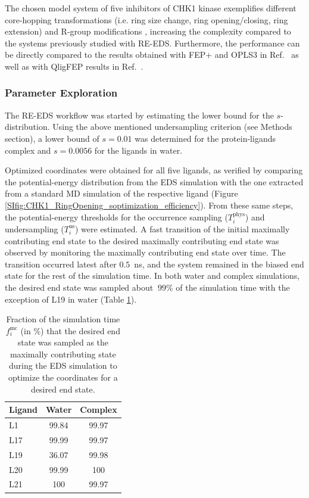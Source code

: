The chosen model system of five inhibitors of CHK1 kinase exemplifies different core-hopping transformations (i.e. ring size change, ring opening/closing, ring extension) and R-group modifications \cite{Wang2017}, increasing the complexity compared to the systems previously studied with RE-EDS. Furthermore, the performance can be directly compared to the results obtained with FEP+ and OPLS3 in Ref.~\cite{Wang2017} as well as with QligFEP results in Ref.~\cite{Jespers2019}.

\subsubsection{Parameter Exploration}
The RE-EDS workflow was started by estimating the lower bound for the $s$-distribution. Using the above mentioned undersampling criterion (see Methods section), a lower bound of $s=0.01$ was determined for the protein-ligands complex and $s=0.0056$ for the ligands in water. 

Optimized coordinates were obtained for all five ligands, as verified by comparing the potential-energy distribution from the EDS simulation with the one extracted from a standard MD simulation of the respective ligand (Figure \ref{SIfig:CHK1_RingOpening_soptimization_efficiency}). 
From these same steps, the potential-energy thresholds for the occurrence sampling ($T_{i}^{\text{phys}}$) and undersampling ($T_{i}^{\text{us}}$) were estimated.
A fast transition of the initial maximally contributing end state to the desired maximally contributing end state was observed by monitoring the maximally contributing end state over time.
The transition occurred latest after $0.5$~ns, and the system remained in the biased end state for the rest of the simulation time.
In both water and complex simulations, the desired end state was sampled about $~99\%$ of the simulation time with the exception of L19 in water (Table \ref{SItab:RingCycleOpenin_sampling_fraction_optimizedStates}).



\begin{table}[H]
\centering
\caption{Fraction of the simulation time $f_i^{\text{mc}}$ (in \%) that the desired end state was sampled as the maximally contributing state during the EDS simulation to optimize the coordinates for a desired end state.}
\label{SItab:RingCycleOpenin_sampling_fraction_optimizedStates}
\begin{adjustbox}{max width=\textwidth}

\begin{tabular}{ l | c c }
 Ligand & Water  & Complex \\ 
 \hline
     L1 & 99.84 & 99.97 \\ 
     L17 & 99.99 & 99.97\\
     L19 & 36.07 &  99.98\\
     L20 & 99.99 & 100\\
     L21 & 100 & 99.97 \\
\end{tabular}
\end{adjustbox}
\end{table}

